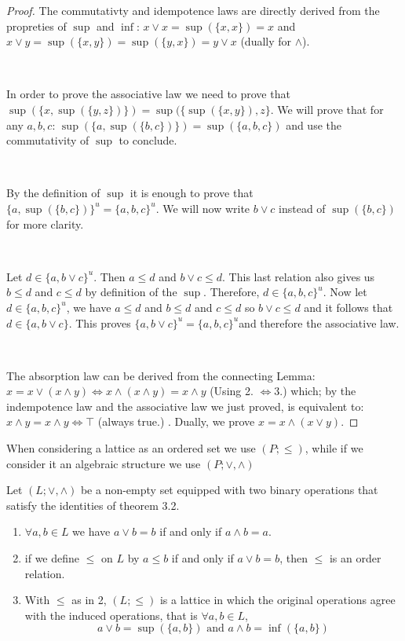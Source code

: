 \begin{proof} The commutativty and idempotence laws are directly derived from
the propreties of $\sup$ and $\inf$: $x \lor x = \sup(\{x,x\}) = x$ and $x \lor
y = \sup(\{x,y\}) = \sup(\{y,x\}) = y \lor x$ (dually for $\land$).

	\

	In order to prove the associative law we need to prove that $\sup(\{x,
\sup(\{y,z\})\}) = \sup(\{\sup(\{x,y\}), z\}$. We will prove that for any
$a,b,c$: $\sup(\{a,\sup(\{b,c\})\}) = \sup(\{a,b,c\})$ and use the commutativity
of $\sup$ to conclude.

	\

	By the definition of $\sup$ it is enough to prove that $\{a,
\sup(\{b,c\})\}^u =\{a,b,c\}^u$. We will now write $b \lor c$ instead of
$\sup(\{b,c\})$ for more clarity.

	\

	Let $d \in\{a, b \lor c\}^u$. Then $a \leq d$ and $b \lor c \leq d$. This
last relation also gives us $b \leq d$ and $c \leq d$ by definition of the
$\sup$. Therefore, $d \in\{a,b,c\}^u$. Now let $d \in\{a,b,c\}^u$, we have $a
\leq d$ and $b \leq d$ and $c \leq d$ so $b \lor c\leq d$ and it follows that $d
\in\{a, b \lor c\}$. This proves $\{a,b \lor c\}^u =\{a,b,c\}^u$and therefore
the associative law.

	\

	The absorption law can be derived from the connecting Lemma: $x = x \lor (x
\land y) \Leftrightarrow x \land (x \land y) = x \land y$ (Using
2. $\Leftrightarrow 3.$) which; by the indempotence law and the associative law
we just proved, is equivalent to: $x \land y = x \land y\Leftrightarrow \top$
(always true.) . Dually, we prove $x = x \land (x \lor y)$.
\end{proof}

\begin{notation} When considering a lattice as an ordered set we use $(P;
\leq)$, while if we consider it an algebraic structure we use $(P; \lor, \land)$
\end{notation}

\begin{theorem} Let $(L;\lor,\land)$ be a non-empty set equipped with two binary
operations that satisfy the identities of theorem 3.2.
\begin{enumerate}
\item $\forall a,b \in L$ we have $a \lor b = b$ if and only if $a \land b = a$.
\item if we define $\leq$ on $L$ by $a \leq b$ if and only if $a \lor b = b$,
then $\leq$ is an order relation.
\item With $\leq$ as in 2, $(L;\leq)$ is a lattice in which the original
operations agree with the induced operations, that is $\forall a,b \in L$,
\begin{equation*} a \lor b = \sup(\{a,b\}) \text{ and } a \land b =
\inf(\{a,b\})
\end{equation*}
\end{enumerate}
\end{theorem}

